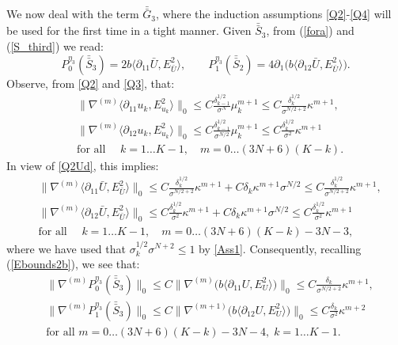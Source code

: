 \documentclass[reqno,twoside,11pt]{amsart}
\newcommand*{\dbar}[1]{\bar{\bar{#1}}}
\numberwithin{equation}{section}
\theoremstyle{plain}
\theoremstyle{definition}
\begin{document}
\medskip

\noindent We now deal with the term $\dbar G_3$, where the induction assumptions
\ref{Q2}-\ref{Q4} will be used for the first time in a tight manner. Given
$\dbar S_3$, from (\ref{fora}) and (\ref{S_third}) we read:
$$P_0^{\eta_3}(\dbar S_3) = 2b \langle \partial_{11}\bar U, E^2_{\bar U}\rangle, 
\qquad P_1^{\eta_3}(\dbar S_2) =
4\partial_1\big(b\langle\partial_{12}\bar U, E^2_{\bar U}\rangle\big).$$
Observe, from \ref{Q2} and \ref{Q3}, that:
\begin{equation*}
\begin{split}
& \|\nabla^{(m)}\langle \partial_{11}u_k, E^2_{u_k}\rangle \|_0\leq
C\frac{\delta_{k-1}^{1/2}}{\sigma^N}\mu_k^{m+1} \leq 
C\frac{\delta_{k}^{1/2}}{\sigma^{N/2+2}}\kappa^{m+1}, \\ 
& \|\nabla^{(m)}\langle \partial_{12}u_k, E^2_{u_k}\rangle \|_0\leq
C\frac{\delta_{k-1}^{1/2}}{\sigma^{N/2}}\mu_k^{m+1} \leq 
C\frac{\delta_{k}^{1/2}}{\sigma^{2}}\kappa^{m+1} \\
& \mbox{for all } \quad k=1\ldots K-1, \quad m=0\ldots (3N+6)(K-k).
\end{split}
\end{equation*}
In view of \ref{Q2Ud}, this implies:
\begin{equation*}
\begin{split}
& \|\nabla^{(m)}\langle \partial_{11}\bar U, E^2_{\bar U}\rangle\|_0\leq 
C\frac{\delta_{k}^{1/2}}{\sigma^{N/2+2}}\kappa^{m+1} +
C\delta_k\kappa^{m+1}\sigma^{N/2}\leq C\frac{\delta_{k}^{1/2}}{\sigma^{N/2+2}}\kappa^{m+1},\\ 
& \|\nabla^{(m)}\langle \partial_{12}\bar U, E^2_{\bar U}\rangle\|_0\leq 
C\frac{\delta_{k}^{1/2}}{\sigma^{2}}\kappa^{m+1} +
C\delta_k\kappa^{m+1}\sigma^{N/2}\leq C\frac{\delta_{k}^{1/2}}{\sigma^{2}}\kappa^{m+1}
\\ & \mbox{for all }\quad k=1\ldots K-1, \quad m=0\ldots (3N+6)(K-k)-3N-3,
\end{split}
\end{equation*}
where we have used that $\sigma_k^{1/2}\sigma^{N+2}\leq 1$ by \ref{Ass1}.
Consequently, recalling (\ref{Ebounds2b}), we see that:
\begin{equation*}
\begin{split}
& \|\nabla^{(m)}P_0^{\eta_3}(\dbar S_3)\|_0 \leq C
\|\nabla^{(m)}\big(b \langle \partial_{11}U, E^2_{U}\rangle\big)\|_0\leq
C\frac{\delta_{k}}{\sigma^{N/2+2}}\kappa^{m+1},
\\ & \|\nabla^{(m)}P_1^{\eta_3}(\dbar S_3)\|_0 \leq C
\|\nabla^{(m+1)}\big(b \langle \partial_{12}U, E^2_{U}\rangle\big)\|_0\leq
 C\frac{\delta_{k}}{\sigma^2}\kappa^{m+2} \\ & \mbox{for all }
 m=0\ldots (3N+6)(K-k)-3N-4,\;k=1\ldots K-1.
\end{split}
\end{equation*}
\end{document}
